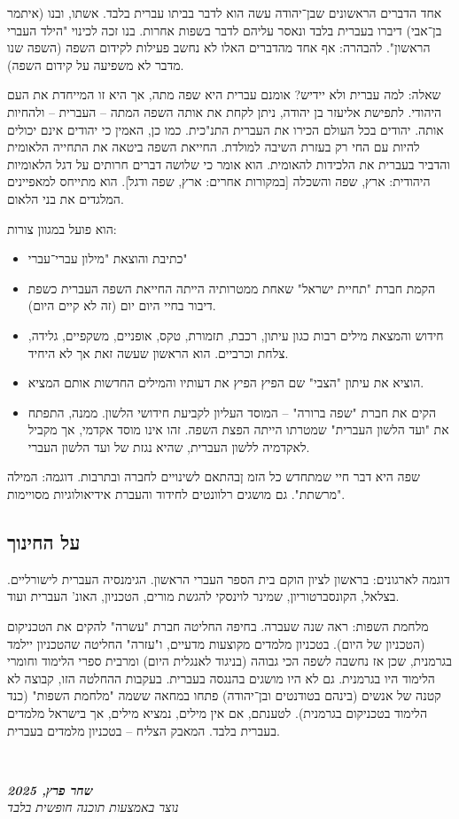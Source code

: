\documentclass[]{article}
\newcommand\ndoc  {\dotfill \\ \vfil {\begin{center} {\textbf{\textit{שחר פרץ, 2025}} \\ \scriptsize \textit{נוצר באמצעות תוכנה חופשית בלבד}} \end{center}} \vfil	}
\begin{document}
	אחד הדברים הראשונים שבן־יהודה עשה הוא לדבר בביתו עברית בלבד. אשתו, ובנו (איתמר בן־אבי) דיברו בעברית בלבד ונאסר עליהם לדבר בשפות אחרות. בנו זכה לכינוי "הילד העברי הראשון". להבהרה: אף אחד מהדברים האלו לא נחשב פעילות לקידום השפה (השפה שנו מדבר לא משפיעה על קידום השפה). 
	
	שאלה: למה עברית ולא יידיש? אומנם עברית היא שפה מתה, אך היא זו המייחדת את העם היהודי. לתפישת אליעזר בן יהודה, ניתן לקחת את אותה השפה המתה – העברית – ולהחיות אותה. יהודים בכל העולם הכירו את העברית התנ"כית. כמו כן, האמין כי יהודים  אינם יכולים להיות עם החי רק בעזרת השיבה למולדת. החייאת השפה ביטאה את התחייה הלאומית והדביר בעברית את הלכידות להאומית. הוא אומר כי שלושה דברים חרותים על דגל הלאומיות היהודית: ארץ, שפה והשכלה [במקורות אחרים: ארץ, שפה ודגל]. הוא מתייחס למאפיינים המלגדים את בני הלאום. 
	
	הוא פועל במגוון צורות: 
	\begin{itemize}
		\item כתיבת והוצאת "מילון עברי־עברי"
		\item הקמת חברת "תחיית ישראל" שאחת ממטרותיה הייתה החייאת השפה העברית כשפת דיבור בחיי היום יום (זה לא קיים היום). 
		\item חידוש והמצאת מילים רבות כגון עיתון, רכבת, תזמורת, טקס, אופניים, משקפיים, גלידה, צלחת וכרביים. הוא הראשון שעשה זאת אך לא היחיד. 
		\item הוציא את עיתון "הצבי" שם הפיץ הפיץ את דעותיו והמילים החדשות אותם המציא. 
		\item הקים את חברת "שפה ברורה" – המוסד העליון לקביעת חידושי הלשון. ממנה, התפתח את "ועד הלשון העברית" שמטרתו הייתה הפצת השפה. זהו אינו מוסד אקדמי, אך מקביל לאקדמיה ללשון העברית, שהיא נגזת של ועד הלשון העברי. 
	\end{itemize}
	
	שפה היא דבר חיי שמתחדש כל הזמ ןבהתאם לשינויים לחברה ובתרבות. דוגמה: המילה "מרשתת". גם מושגים רלוונטים לחידוד והעברת אידיאולוגיות מסויימות. 
	
	\subsection{על החינוך}
	דוגמה לארגונים: בראשון לציון הוקם בית הספר העברי הראשון. הגימנסיה העברית לישורליים. בצלאל, הקונסברטוריון, שמינר לוינסקי להגשת מורים, הטכניון, האונ' העברית ועוד. 
	
	מלחמת השפות: ראה שנה שעברה. בחיפה החליטה חברת "עשרה" להקים את הטכניקום (הטכניון של היום). בטכניון מלמדים מקוצעות מדעיים, ו"עזרה" החליטה שהטכניון יילמד בגרמנית, שכן אז נחשבה לשפה הכי גבוהה (בניגוד לאנגלית היום) ומרבית ספרי הלימוד וחומרי הלימוד היו בגרמנית. גם לא היו מושגים בהנגסה בעברית. בעקבות ההחלטה הזו, קבוצה לא קטנה של אנשים (בינהם בטודנטים ובן־יהודה) פתחו במחאה ששמה "מלחמת השפות" (כנד הלימוד בטכניקום בגרמנית). לטענתם, אם אין מילים, נמציא מילים, אך בישראל מלמדים בעברית בלבד. המאבק הצליח – בטכניון מלמדים בעברית. 
	
	\ndoc 
	
\end{document}
